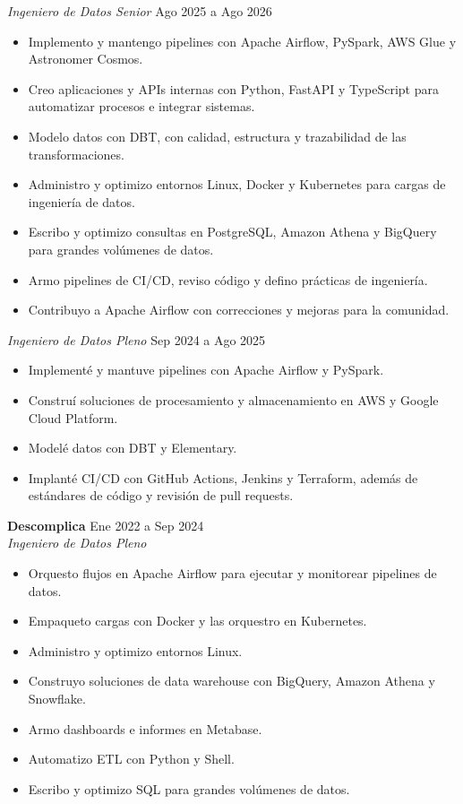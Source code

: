 \documentclass[a4paper,10pt]{article}
\begin{document}
\textit{Ingeniero de Datos Senior} \hfill Ago 2025 a Ago 2026
\begin{itemize}
    \item Implemento y mantengo pipelines con Apache Airflow, PySpark, AWS Glue y Astronomer Cosmos.
    \item Creo aplicaciones y APIs internas con Python, FastAPI y TypeScript para automatizar procesos e integrar sistemas.
    \item Modelo datos con DBT, con calidad, estructura y trazabilidad de las transformaciones.
    \item Administro y optimizo entornos Linux, Docker y Kubernetes para cargas de ingeniería de datos.
    \item Escribo y optimizo consultas en PostgreSQL, Amazon Athena y BigQuery para grandes volúmenes de datos.
    \item Armo pipelines de CI/CD, reviso código y defino prácticas de ingeniería.
    \item Contribuyo a Apache Airflow con correcciones y mejoras para la comunidad.
\end{itemize}

\textit{Ingeniero de Datos Pleno} \hfill Sep 2024 a Ago 2025
\begin{itemize}
    \item Implementé y mantuve pipelines con Apache Airflow y PySpark.
    \item Construí soluciones de procesamiento y almacenamiento en AWS y Google Cloud Platform.
    \item Modelé datos con DBT y Elementary.
    \item Implanté CI/CD con GitHub Actions, Jenkins y Terraform, además de estándares de código y revisión de pull requests.
\end{itemize}

\textbf{Descomplica} \hfill Ene 2022 a Sep 2024 \\
\textit{Ingeniero de Datos Pleno}
\begin{itemize}
    \item Orquesto flujos en Apache Airflow para ejecutar y monitorear pipelines de datos.
    \item Empaqueto cargas con Docker y las orquestro en Kubernetes.
    \item Administro y optimizo entornos Linux.
    \item Construyo soluciones de data warehouse con BigQuery, Amazon Athena y Snowflake.
    \item Armo dashboards e informes en Metabase.
    \item Automatizo ETL con Python y Shell.
    \item Escribo y optimizo SQL para grandes volúmenes de datos.
\end{itemize}
\end{document}
